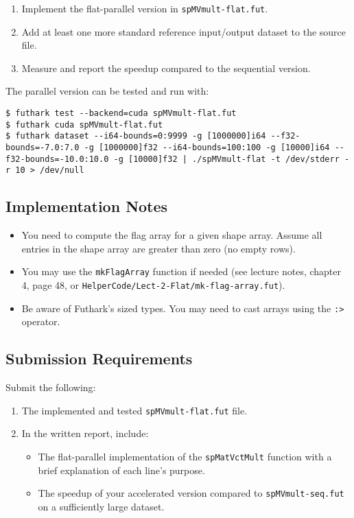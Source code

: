 \documentclass{article}
\begin{document}
\begin{enumerate}
    \item Implement the flat-parallel version in \texttt{spMVmult-flat.fut}.
    \item Add at least one more standard reference input/output dataset to the source file.
    \item Measure and report the speedup compared to the sequential version.
\end{enumerate}

The parallel version can be tested and run with:

\begin{verbatim}
$ futhark test --backend=cuda spMVmult-flat.fut
$ futhark cuda spMVmult-flat.fut
$ futhark dataset --i64-bounds=0:9999 -g [1000000]i64 --f32-bounds=-7.0:7.0 -g [1000000]f32 --i64-bounds=100:100 -g [10000]i64 --f32-bounds=-10.0:10.0 -g [10000]f32 | ./spMVmult-flat -t /dev/stderr -r 10 > /dev/null
\end{verbatim}

\subsection{Implementation Notes}

\begin{itemize}
    \item You need to compute the flag array for a given shape array. Assume all entries in the shape array are greater than zero (no empty rows).
    \item You may use the \texttt{mkFlagArray} function if needed (see lecture notes, chapter 4, page 48, or \texttt{HelperCode/Lect-2-Flat/mk-flag-array.fut}).
    \item Be aware of Futhark's sized types. You may need to cast arrays using the \texttt{:>} operator.
\end{itemize}

\subsection{Submission Requirements}

Submit the following:

\begin{enumerate}
    \item The implemented and tested \texttt{spMVmult-flat.fut} file.
    \item In the written report, include:
    \begin{itemize}
        \item The flat-parallel implementation of the \texttt{spMatVctMult} function with a brief explanation of each line's purpose.
        \item The speedup of your accelerated version compared to \texttt{spMVmult-seq.fut} on a sufficiently large dataset.
    \end{itemize}
\end{enumerate}
\end{document}
